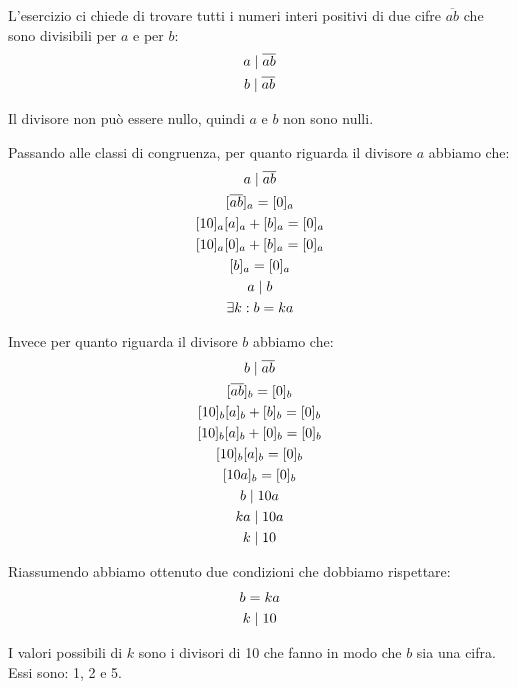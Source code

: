 \begin{soluzione}
    L'esercizio ci chiede di trovare tutti i numeri interi positivi di due cifre $\overline{ab}$ che sono divisibili
    per $a$ e per $b$:
    \begin{gather*}
        a  \mid  \overline{ab} \\
        b  \mid  \overline{ab}
    \end{gather*}

    Il divisore non può essere nullo, quindi $a$ e $b$ non sono nulli.

    Passando alle classi di congruenza, per quanto riguarda il divisore $a$ abbiamo che:
    \begin{gather*}
        a  \mid  \overline{ab} \\
        [\overline{ab}]_a = [0]_a \\
        [10]_a[a]_a + [b]_a = [0]_a \\
        [10]_a[0]_a + [b]_a = [0]_a \\
        [b]_a = [0]_a \\
        a  \mid  b \\
        \exists k : b = ka
    \end{gather*}

    Invece per quanto riguarda il divisore $b$ abbiamo che:
    \begin{gather*}
        b  \mid  \overline{ab} \\
        [\overline{ab}]_b = [0]_b \\
        [10]_b[a]_b + [b]_b = [0]_b \\
        [10]_b[a]_b + [0]_b = [0]_b \\
        [10]_b[a]_b = [0]_b \\
        [10a]_b = [0]_b \\
        b  \mid  10a \\
        ka  \mid  10a \\
        k  \mid  10
    \end{gather*}

    Riassumendo abbiamo ottenuto due condizioni che dobbiamo rispettare:
    \begin{gather*}
        b = ka \\
        k  \mid  10
    \end{gather*}

    I valori possibili di $k$ sono i divisori di 10 che fanno in modo che $b$ sia una cifra.
    Essi sono: 1, 2 e 5.


\end{soluzione}
